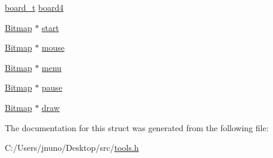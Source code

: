 \begin{DoxyCompactItemize}
\item 
\hyperlink{structboard__t}{board\+\_\+t} \hyperlink{group___game_gadb54bfdf7a3bb4d8e2835e93b2de8a09}{board4}
\item 
\hyperlink{struct_bitmap}{Bitmap} $\ast$ \hyperlink{group___game_gad50c72d4974332bda06a2cd6831b2175}{start}
\item 
\hyperlink{struct_bitmap}{Bitmap} $\ast$ \hyperlink{group___game_gad10f31a0fdb4d694a65599634f4b391a}{mouse}
\item 
\hyperlink{struct_bitmap}{Bitmap} $\ast$ \hyperlink{group___game_ga4b78da9fb4428d17e14ed11877396016}{menu}
\item 
\hyperlink{struct_bitmap}{Bitmap} $\ast$ \hyperlink{group___game_ga3b1e7565fd6de9b4795f4d1a2d00ec54}{pause}
\item 
\hyperlink{struct_bitmap}{Bitmap} $\ast$ \hyperlink{group___game_gae4e44e3db4f37bac0f34111b5cd471d1}{draw}
\end{DoxyCompactItemize}


The documentation for this struct was generated from the following file\+:\begin{DoxyCompactItemize}
\item 
C\+:/\+Users/jnuno/\+Desktop/src/\hyperlink{tools_8h}{tools.\+h}\end{DoxyCompactItemize}
